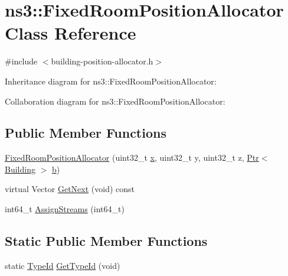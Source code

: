 \hypertarget{classns3_1_1FixedRoomPositionAllocator}{}\section{ns3\+:\+:Fixed\+Room\+Position\+Allocator Class Reference}
\label{classns3_1_1FixedRoomPositionAllocator}


{\ttfamily \#include $<$building-\/position-\/allocator.\+h$>$}



Inheritance diagram for ns3\+:\+:Fixed\+Room\+Position\+Allocator\+:


Collaboration diagram for ns3\+:\+:Fixed\+Room\+Position\+Allocator\+:
\subsection*{Public Member Functions}
\begin{DoxyCompactItemize}
\item 
\hyperlink{classns3_1_1FixedRoomPositionAllocator_ac06719940096528be0b6aa2cfcb697c2}{Fixed\+Room\+Position\+Allocator} (uint32\+\_\+t \hyperlink{lte__link__budget__x2__handover__measures_8m_a9336ebf25087d91c818ee6e9ec29f8c1}{x}, uint32\+\_\+t y, uint32\+\_\+t z, \hyperlink{classns3_1_1Ptr}{Ptr}$<$ \hyperlink{classns3_1_1Building}{Building} $>$ \hyperlink{lte__pathloss_8m_a21ad0bd836b90d08f4cf640b4c298e7c}{b})
\item 
virtual Vector \hyperlink{classns3_1_1FixedRoomPositionAllocator_a1fc0352d2663bac3336aa89e5b0e9a24}{Get\+Next} (void) const 
\item 
int64\+\_\+t \hyperlink{classns3_1_1FixedRoomPositionAllocator_ac3af152b08b5fcba687a30cf3043a8d6}{Assign\+Streams} (int64\+\_\+t)
\end{DoxyCompactItemize}
\subsection*{Static Public Member Functions}
\begin{DoxyCompactItemize}
\item 
static \hyperlink{classns3_1_1TypeId}{Type\+Id} \hyperlink{classns3_1_1FixedRoomPositionAllocator_ad764f1d8b8a236c77d08e64e9c39d4b5}{Get\+Type\+Id} (void)
\end{DoxyCompactItemize}

